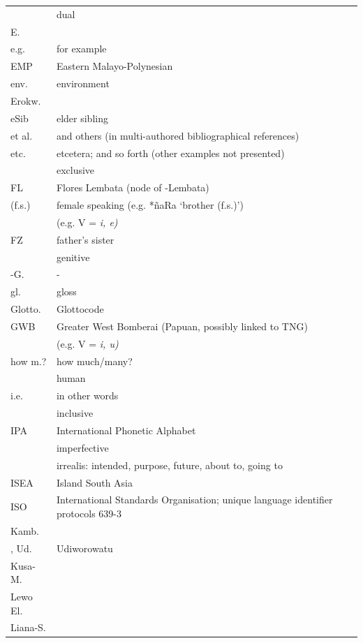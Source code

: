 {\begin{xltabular}{\textwidth}[l]{l>{\raggedright\arraybackslash}X}
	&	dual	\\
E.	&		\\
e.g.	&	for example	\\
EMP	&	Eastern Malayo-Polynesian	\\
env.	&	environment	\\
Erokw.	&		\\
eSib	&	elder sibling	\\
et al.	&	and others (in multi-authored bibliographical references)	\\
etc.	&	etcetera; and so forth (other examples not presented)	\\
	&	exclusive	\\
FL	&	Flores Lembata (node of -Lembata) \\
(f.s.)	&	female speaking (e.g. *ñaRa ‘brother (f.s.)’)	\\
	&	 (e.g. V = \it{i, e})	\\
FZ	&	father's sister	\\
	&	genitive	\\
-G.	&	-	\\
gl.	&	gloss	\\
Glotto.	&	Glottocode \citep{Hammarstrom2023}	\\
GWB	&	Greater West Bomberai (Papuan, possibly linked to TNG)	\\
	&	 (e.g. V\tsc{[+high]} = \it{i, u})	\\
how m.?	&	how much/many?	\\
	&	human 	\\
i.e.	&	in other words	\\
	&	inclusive	\\
IPA	&	International Phonetic Alphabet	\\
	&	imperfective	\\
	&	irrealis: intended, purpose, future, about to, going to	\\
ISEA	&	Island South Asia	\\
ISO	&	International Standards Organisation; unique language identifier protocols 639-3 	\\
Kamb.	&		\\
, Ud.	&	Udiworowatu 	\\
Kusa-M.	&		\\
Lewo El.	&		\\
Liana-S.	&		\\

\end{xltabular}}
